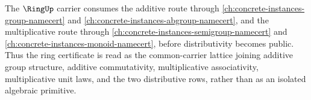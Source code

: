 The $\RingUp$ carrier consumes the additive route through \autoref{ch:concrete-instances-group-namecert} and \autoref{ch:concrete-instances-abgroup-namecert}, and the multiplicative route through \autoref{ch:concrete-instances-semigroup-namecert} and \autoref{ch:concrete-instances-monoid-namecert}, before distributivity becomes public. Thus the ring certificate is read as the common-carrier lattice joining additive group structure, additive commutativity, multiplicative associativity, multiplicative unit laws, and the two distributive rows, rather than as an isolated algebraic primitive.
